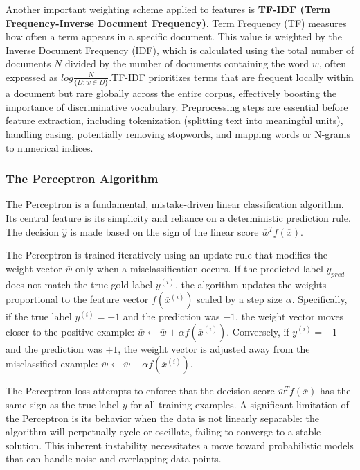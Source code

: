 \documentclass{article}
\begin{document}
Another important weighting scheme applied to features is \textbf{TF-IDF (Term Frequency-Inverse Document Frequency)}. Term Frequency (TF) measures how often a term appears in a specific document. This value is weighted by the Inverse Document Frequency (IDF), which is calculated using the total number of documents $N$ divided by the number of documents containing the word $w$, often expressed as $log\frac{N}{\{D: w \in D\}}$.TF-IDF prioritizes terms that are frequent locally within a document but rare globally across the entire corpus, effectively boosting the importance of discriminative vocabulary. Preprocessing steps are essential before feature extraction, including tokenization (splitting text into meaningful units), handling casing, potentially removing stopwords, and mapping words or N-grams to numerical indices.

\subsubsection{The Perceptron Algorithm}

The Perceptron is a fundamental, mistake-driven linear classification algorithm. Its central feature is its simplicity and reliance on a deterministic prediction rule. The decision $\hat{y}$ is made based on the sign of the linear score $\overline{w}^{T}f(\overline{x})$.

The Perceptron is trained iteratively using an update rule that modifies the weight vector $\overline{w}$ only when a misclassification occurs. If the predicted label $y_{pred}$ does not match the true gold label $y^{(i)}$, the algorithm updates the weights proportional to the feature vector $f(\overline{x}^{(i)})$ scaled by a step size $\alpha$. Specifically, if the true label $y^{(i)} = +1$ and the prediction was $-1$, the weight vector moves closer to the positive example: $\overline{w} \leftarrow \overline{w} + \alpha f(\overline{x}^{(i)})$. Conversely, if $y^{(i)} = -1$ and the prediction was $+1$, the weight vector is adjusted away from the misclassified example: $\overline{w} \leftarrow \overline{w} - \alpha f(\overline{x}^{(i)})$.

The Perceptron loss attempts to enforce that the decision score $\overline{w}^{T}f(\overline{x})$ has the same sign as the true label $y$ for all training examples. A significant limitation of the Perceptron is its behavior when the data is not linearly separable: the algorithm will perpetually cycle or oscillate, failing to converge to a stable solution. This inherent instability necessitates a move toward probabilistic models that can handle noise and overlapping data points.
\end{document}
